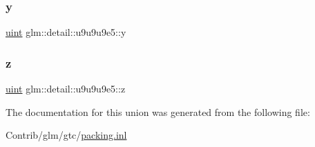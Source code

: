 \subsubsection{\texorpdfstring{y}{y}}
{\footnotesize\ttfamily \mbox{\hyperlink{group__core__precision_ga4fd29415871152bfb5abd588334147c8}{uint}} glm\+::detail\+::u9u9u9e5\+::y}

\mbox{\label{unionglm_1_1detail_1_1u9u9u9e5_a9eacfe6494175ce78b6e516746bb63b7}} 
\subsubsection{\texorpdfstring{z}{z}}
{\footnotesize\ttfamily \mbox{\hyperlink{group__core__precision_ga4fd29415871152bfb5abd588334147c8}{uint}} glm\+::detail\+::u9u9u9e5\+::z}



The documentation for this union was generated from the following file\+:\begin{DoxyCompactItemize}
\item 
Contrib/glm/gtc/\mbox{\hyperlink{packing_8inl}{packing.\+inl}}\end{DoxyCompactItemize}
